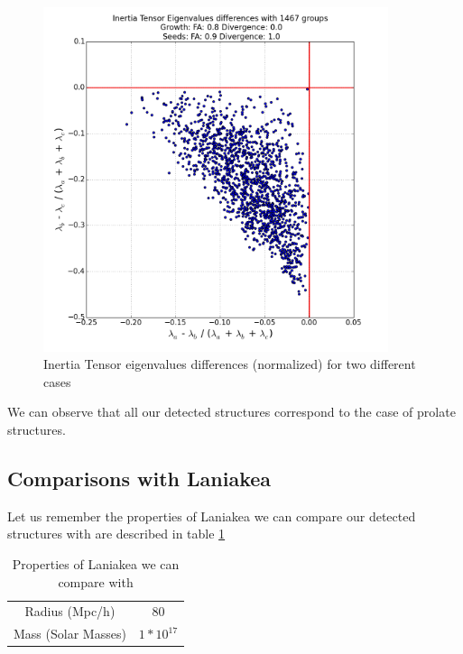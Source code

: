 \documentclass[12pt]{article}
\begin{document}
\begin{figure}[ht]
\begin{minipage}{.5\textwidth}
  \includegraphics[width=0.9\textwidth]{groups/inertiaplots/inertia_diff_09_Trace_10_search_FA_08_Trace_00.png}
\end{minipage}
\label{fg:inertia_diff}
\caption{Inertia Tensor eigenvalues differences (normalized) for two different cases}
\end{figure}
\FloatBarrier

\begin{par}
We can observe that all our detected structures
 correspond to the case of prolate structures. 
\end{par}

\subsection{Comparisons with Laniakea}
\begin{par}
 Let us remember the properties of Laniakea we can compare our detected structures with are described in table \ref{tab:laniakea}
\end{par}
\begin{table}[ht]
    \centering
    \begin{tabular}{|c|c|}
        Radius (Mpc/h) & 80  \\
        Mass (Solar Masses) & $1*10^{17}$  \\
    \end{tabular}
    \caption{Properties of Laniakea we can compare with}
    \label{tab:laniakea}
\end{table}
\FloatBarrier
\end{document}
